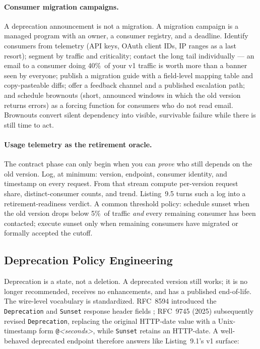\paragraph{Consumer migration campaigns.}
\label{subsec:ch9-campaigns}
A deprecation announcement is not a migration. A migration campaign is a
managed program with an owner, a consumer registry, and a deadline. Identify
consumers from telemetry (API keys, OAuth client IDs, IP ranges as a last
resort); segment by traffic and criticality; contact the long tail
individually --- an email to a consumer doing 40\%\ of your v1 traffic is
worth more than a banner seen by everyone; publish a migration guide with a
field-level mapping table and copy-pasteable diffs; offer a feedback channel
and a published escalation path; and schedule brownouts (short, announced
windows in which the old version returns errors) as a forcing function for
consumers who do not read email. Brownouts convert silent dependency into
visible, survivable failure while there is still time to act.

\paragraph{Usage telemetry as the retirement oracle.}
The contract phase can only begin when you can \emph{prove} who still depends
on the old version. Log, at minimum: version, endpoint, consumer identity,
and timestamp on every request. From that stream compute per-version request
share, distinct-consumer counts, and trend. Listing~9.5 turns such a log into
a retirement-readiness verdict. A common threshold policy: schedule sunset
when the old version drops below 5\%\ of traffic \emph{and} every remaining
consumer has been contacted; execute sunset only when remaining consumers
have migrated or formally accepted the cutoff.

\subsection{Deprecation Policy Engineering}
\label{subsec:ch9-deprecation}

Deprecation is a state, not a deletion. A deprecated version still works; it
is no longer recommended, receives no enhancements, and has a published
end-of-life. The wire-level vocabulary is standardized. RFC~8594 introduced
the \texttt{Deprecation} and \texttt{Sunset} response header fields
\cite{rfc8594}; RFC~9745 (2025) subsequently revised \texttt{Deprecation},
replacing the original HTTP-date value with a Unix-timestamp form
\texttt{@}\emph{<seconds>}, while \texttt{Sunset} retains an HTTP-date. A
well-behaved deprecated endpoint therefore answers like Listing~9.1's v1
surface:

